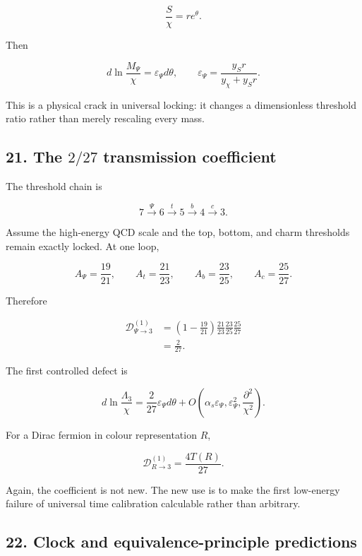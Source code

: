 \documentclass[
]{article}
\begin{document}
\[
\frac S\chi=re^\theta.
\]

Then

\[
\boxed{
 d\ln\frac{M_\Psi}{\chi}
 =\varepsilon_\Psi d\theta,
\qquad
\varepsilon_\Psi=\frac{y_Sr}{y_\chi+y_Sr}.
}
\]

This is a physical crack in universal locking: it changes a
dimensionless threshold ratio rather than merely rescaling every mass.

\hypertarget{the-227-transmission-coefficient}{%
\subsection{\texorpdfstring{21. The \(2/27\) transmission
coefficient}{21. The 2/27 transmission coefficient}}\label{the-227-transmission-coefficient}}

The threshold chain is

\[
7\xrightarrow{\Psi}6\xrightarrow{t}5\xrightarrow{b}4\xrightarrow{c}3.
\]

Assume the high-energy QCD scale and the top, bottom, and charm
thresholds remain exactly locked. At one loop,

\[
A_\Psi=\frac{19}{21},
\qquad
A_t=\frac{21}{23},
\qquad
A_b=\frac{23}{25},
\qquad
A_c=\frac{25}{27}.
\]

Therefore

\[
\begin{aligned}
\mathcal D_{\Psi\to3}^{(1)}
&=\left(1-\frac{19}{21}\right)
\frac{21}{23}\frac{23}{25}\frac{25}{27}\\
&=\boxed{\frac{2}{27}}.
\end{aligned}
\]

The first controlled defect is

\[
\boxed{
 d\ln\frac{\Lambda_3}{\chi}
 =\frac{2}{27}\varepsilon_\Psi d\theta
 +O\left(\alpha_s\varepsilon_\Psi,
 \varepsilon_\Psi^2,
 \frac{\partial^2}{\chi^2}\right).
}
\]

For a Dirac fermion in colour representation \(R\),

\[
\mathcal D_{R\to3}^{(1)}=\frac{4T(R)}{27}.
\]

Again, the coefficient is not new. The new use is to make the first
low-energy failure of universal time calibration calculable rather than
arbitrary.

\hypertarget{clock-and-equivalence-principle-predictions}{%
\subsection{22. Clock and equivalence-principle
predictions}\label{clock-and-equivalence-principle-predictions}}
\end{document}
